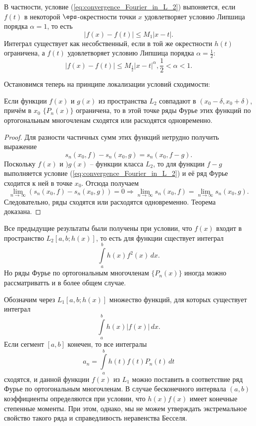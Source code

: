 В частности, условие (\ref{eq:convergence_Fourier_in_L_2}) выпоняется, если
\( f(t) \) в некоторой \( \eps \)-окрестности точки \( x \) удовлетворяет
условию Липшица порядка \( \alpha = 1 \), то есть
\[
    |f(x) - f(t)| \le M_1 |x - t|.
\]
Интеграл существует как несобственный, если в той же окрестности \( h(t) \)
ограничена, а \( f(t) \) удовлетворяет условию Липшица порядка
\( \alpha = \frac{1}{2} \):
\[
    |f(x) - f(t)| \le M_\frac{1}{2} |x - t|^\alpha, \frac{1}{2} < \alpha < 1.
\]

Остановимся теперь на принципе локализации условий сходимости:
\begin{theorem}
    Если функции \( f(x) \) и \( g(x) \) из пространства \( L_2 \) совпадают в
    \( (x_0 - \delta, x_0 + \delta) \), причём в \( x_0 \) \( \{P_n(x)\} \)
    ограничена, то в этой точке ряды Фурье этих функций по ортогональным
    многочленам сходятся или расходятся одновременно.
\end{theorem}
\begin{proof}
    Для разности частичных сумм этих функций нетрудно получить выражение
    \[
        s_n(x_0, f) - s_n(x_0, g) = s_n(x_0, f-g).
    \]
    Поскольку \( f(x) \) и \() g(x) \) -- функции класса \( L_2 \), то для
    функции \( f-g \) выполняется условие (\ref{eq:convergence_Fourier_in_L_2})
    и её ряд Фурье сходится к ней в точке \( x_0 \). Отсюда получаем
    \[
        \lim_{n\rightarrow\infty}(s_n(x_0, f) - s_n(x_0, g)) = 0 \Rightarrow
        \lim_{n\rightarrow\infty}s_n(x_0, f) =
        \lim_{n\rightarrow\infty}s_n(x_0, g).
    \]
    Следовательно, ряды сходятся или расходятся одновременно. Теорема доказана.
\end{proof}

Все предыдущие результаты были получены при условии, что \( f(x) \) входит в
пространство \( L_2[a,b;h(x)] \), то есть для функции сществует интеграл
\[
    \int\limits_a^b h(x) f^2(x)\,dx.
\]
Но ряды Фурье по ортогональным многочленам \( \{P_n(x)\} \) иногда можно
рассматриватть и в более общем случае.

Обозначим через \( L_1[a,b;h(x)] \) множество функций, для которых существует
интеграл
\[
    \int\limits_a^b h(x) |f(x)|\,dx.
\]
Если сегмент \( [a,b] \) конечен, то все интегралы
\[
    a_n = \int\limits_a^b h(t)f(t)P_n(t)\,dt
\]
сходятся, и данной функции \( f(x) \) из \( L_1 \) можно поставить в
соответствие ряд Фурье по ортогональным многочленам. В случае бесконечного
интервала \( (a,b) \) коэффициенты определяются при условии, что \( h(x)f(x) \)
имеет конечные степенные моменты. При этом, однако, мы не можем утверждать
экстремальное свойство такого ряда и справедливость неравенства Бесселя.